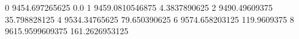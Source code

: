 0 9454.697265625 0.0
1 9459.0810546875 4.3837890625
2 9490.49609375 35.798828125
4 9534.34765625 79.650390625
6 9574.658203125 119.9609375
8 9615.9599609375 161.2626953125
